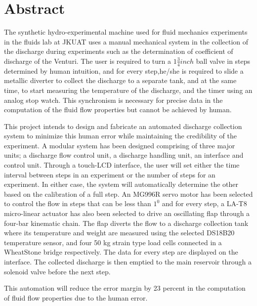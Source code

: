 \section*{Abstract}
\label{sec:}
\par
The synthetic hydro-experimental machine used for fluid mechanics experiments in the fluids lab at JKUAT uses a manual mechanical system in the collection of the discharge during experiments such as the determination of coefficient of discharge of the Venturi. The user is required to turn a $1\frac{3}{4} inch $ ball valve in steps determined by human intuition, and for every step,he/she is required to slide a metallic diverter to collect the discharge to a separate tank, and at the same time, to start measuring the temperature of the discharge, and the timer using an analog stop watch. This synchronism is necessary for precise data in the computation of the fluid flow properties but cannot be achieved by human. 
\par
This project intends to design and fabricate an automated discharge collection system to minimize this human error while maintaining the credibility of the experiment. A modular system has been designed comprising of three major units; a discharge flow control unit, a discharge handling unit, an interface and control unit. Through a touch-LCD interface, the user will set either the time interval between steps in an experiment or the number of steps for an experiment. In either case, the system will automatically determine the other based on the calibration of a full step. An MG996R servo motor has been selected to control the flow in steps that can be less than $1^{0}$ and for every step, a LA-T8 micro-linear actuator has also been selected to drive an oscillating flap through a four-bar kinematic chain. The flap diverts the flow to a discharge collection tank where its temperature and weight are measured using the selected DS18B20 temperature sensor, and four 50 kg strain type load cells connected in a WheatStone bridge respectively. The data for every step are displayed on the interface. The collected discharge is then emptied to the main reservoir through a solenoid valve before the next step.

\par
This automation will reduce the error margin by 23 percent in the computation of fluid flow properties due to the human error.